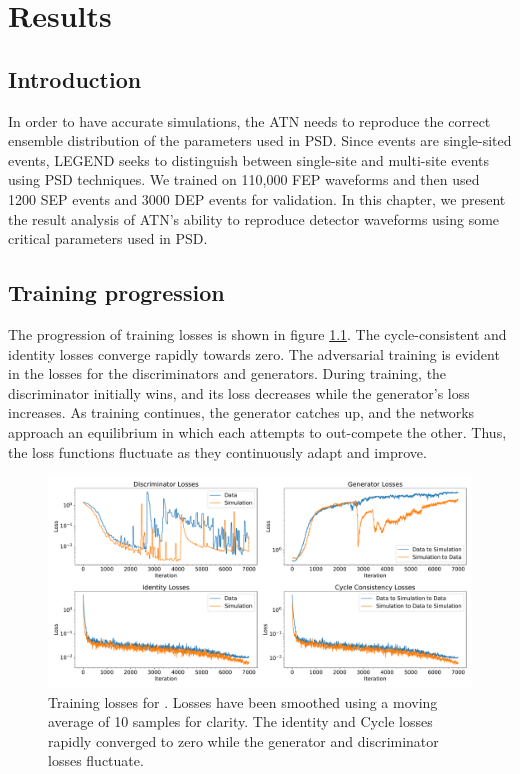 \chapter{{\cpunet} Results}\label{chap:cpu_net_result}

\section{Introduction}
In order to have accurate simulations, the ATN needs to reproduce the correct ensemble distribution of the parameters used in PSD. Since {\onbb} events are single-sited events, LEGEND seeks to distinguish between single-site and multi-site events using PSD techniques. We trained {\cpunet} on 110,000 FEP waveforms and then used 1200 SEP events and 3000 DEP events for validation. In this chapter, we present the result analysis of ATN's ability to reproduce detector waveforms using some critical parameters used in PSD. 

\section{Training progression}
The progression of training losses is shown in figure \ref{fig:training_loss}. The cycle-consistent and identity losses converge rapidly towards zero. The adversarial training is evident in the losses for the discriminators and generators. During training, the discriminator initially wins, and its loss decreases while the generator's loss increases. As training continues, the generator catches up, and the networks approach an equilibrium in which each attempts to out-compete the other. Thus, the loss functions fluctuate as they continuously adapt and improve.

\begin{figure}%
    \includegraphics[width=\linewidth,trim={0.5cm 0pc 0.5cm 0pc},clip]{ch8/figs/loss_funcs.pdf}
    \caption{Training losses for {\cpunet}. Losses have been smoothed using a moving average of 10 samples for clarity. The identity and Cycle losses rapidly converged to zero while the generator and discriminator losses fluctuate.} 
   \label{fig:training_loss}
\end{figure}


